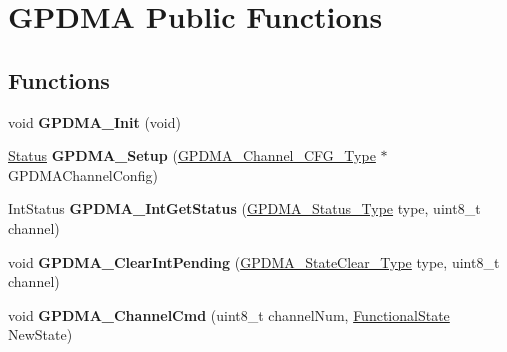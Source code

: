 \hypertarget{group___g_p_d_m_a___public___functions}{\section{\-G\-P\-D\-M\-A \-Public \-Functions}
\label{group___g_p_d_m_a___public___functions}
}
\subsection*{\-Functions}
\begin{DoxyCompactItemize}
\item 
\hypertarget{group___g_p_d_m_a___public___functions_ga490d343c7ac7fb9ab5e5cc4d65cd128a}{void {\bfseries \-G\-P\-D\-M\-A\-\_\-\-Init} (void)}\label{group___g_p_d_m_a___public___functions_ga490d343c7ac7fb9ab5e5cc4d65cd128a}

\item 
\hypertarget{group___g_p_d_m_a___public___functions_ga5437afc98277691232709b3b4bfe46f5}{\hyperlink{group___l_p_c___types___public___types_ga67a0db04d321a74b7e7fcfd3f1a3f70b}{\-Status} {\bfseries \-G\-P\-D\-M\-A\-\_\-\-Setup} (\hyperlink{struct_g_p_d_m_a___channel___c_f_g___type}{\-G\-P\-D\-M\-A\-\_\-\-Channel\-\_\-\-C\-F\-G\-\_\-\-Type} $\ast$\-G\-P\-D\-M\-A\-Channel\-Config)}\label{group___g_p_d_m_a___public___functions_ga5437afc98277691232709b3b4bfe46f5}

\item 
\hypertarget{group___g_p_d_m_a___public___functions_ga5e0bb1222cd347591aeaf11f15edc5b8}{\-Int\-Status {\bfseries \-G\-P\-D\-M\-A\-\_\-\-Int\-Get\-Status} (\hyperlink{group___g_p_d_m_a___public___types_ga456b34475c3dc2d589cb06dcc13f4159}{\-G\-P\-D\-M\-A\-\_\-\-Status\-\_\-\-Type} type, uint8\-\_\-t channel)}\label{group___g_p_d_m_a___public___functions_ga5e0bb1222cd347591aeaf11f15edc5b8}

\item 
\hypertarget{group___g_p_d_m_a___public___functions_ga7eec580c74a05f5c8b94aac492d18b39}{void {\bfseries \-G\-P\-D\-M\-A\-\_\-\-Clear\-Int\-Pending} (\hyperlink{group___g_p_d_m_a___public___types_ga7c7fb8a1b77cbd2c7593bf265b2c0cd3}{\-G\-P\-D\-M\-A\-\_\-\-State\-Clear\-\_\-\-Type} type, uint8\-\_\-t channel)}\label{group___g_p_d_m_a___public___functions_ga7eec580c74a05f5c8b94aac492d18b39}

\item 
\hypertarget{group___g_p_d_m_a___public___functions_ga6e3cf1e659099f8e96743b31de717d39}{void {\bfseries \-G\-P\-D\-M\-A\-\_\-\-Channel\-Cmd} (uint8\-\_\-t channel\-Num, \hyperlink{group___l_p_c___types___public___types_gac9a7e9a35d2513ec15c3b537aaa4fba1}{\-Functional\-State} \-New\-State)}\label{group___g_p_d_m_a___public___functions_ga6e3cf1e659099f8e96743b31de717d39}

\end{DoxyCompactItemize}
